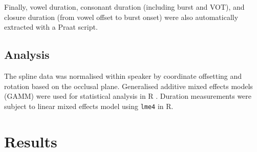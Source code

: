 \documentclass[]{elsarticle}
\begin{document}
Finally, vowel duration, consonant duration (including burst and VOT),
and closure duration (from vowel offset to burst onset) were also
automatically extracted with a Praat script.

\subsection{Analysis}\label{analysis}

The spline data was normalised within speaker by coordinate offsetting
and rotation based on the occlusal plane. Generalised additive mixed
effects models (GAMM) were used for statistical analysis in R
\citep{r-core-team2017}. Duration measurements were subject to linear
mixed effects model using \texttt{lme4} in R.

\section{Results}\label{results}

\renewcommand\refname{Discussion}

\end{document}
